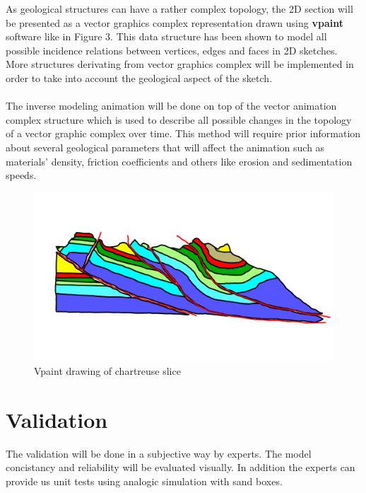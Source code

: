\documentclass[a4paper,11pt]{article}
\begin{document}
As geological structures can have a rather complex topology, the 2D section will be presented as a vector graphics complex representation \cite{vgc} drawn using \textbf{vpaint} software like in Figure 3. This data structure has been shown to model all possible incidence relations between vertices, edges and faces in 2D sketches. More structures derivating from vector graphics complex will be implemented in order to take into account the geological aspect of the sketch.\\\\
The inverse modeling animation will be done on top of the vector animation complex structure \cite{vac} which is used to describe all possible changes in the topology of a vector graphic complex over time.
This method will require prior information about several geological parameters that will affect the animation such as materials' density, friction coefficients and others like erosion and sedimentation speeds.


\begin{figure}[H]
\centering
\includegraphics[scale=0.5]{chartreuse_paint.png}
\caption{Vpaint drawing of chartreuse slice}
\end{figure}

\section{Validation}

The validation will be done in a subjective way by experts. The model concistancy and reliability will be evaluated visually.
In addition the experts can provide us unit tests using analogic simulation with sand boxes.


\end{document}
